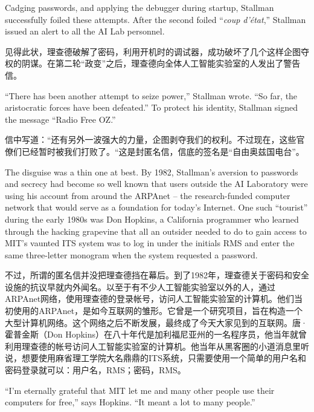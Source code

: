 \ifdefined\eng
Cadging passwords, and applying the debugger during startup, Stallman successfully foiled these attempts. After the second foiled ``\textit{coup d'état},'' Stallman issued an alert to all the AI Lab personnel.
\fi

\ifdefined\chs
见得此状，理查德破解了密码，利用开机时的调试器，成功破坏了几个这样企图夺权的阴谋。在第二轮``政变''之后，理查德向全体人工智能实验室的人发出了警告信。
\fi

\ifdefined\eng
``There has been another attempt to seize power,'' Stallman wrote. ``So far, the aristocratic forces have been defeated.'' To protect his identity, Stallman signed the message ``Radio Free OZ.''
\fi

\ifdefined\chs
信中写道：``还有另外一波强大的力量，企图剥夺我们的权利。不过现在，这些官僚们已经暂时被我们打败了。``这是封匿名信，信底的签名是``自由奥兹国电台''。
\fi

\ifdefined\eng
The disguise was a thin one at best. By 1982, Stallman's aversion to passwords and secrecy had become so well known that users outside the AI Laboratory were using his account from around the ARPAnet -- the research-funded computer network that would serve as a foundation for today's Internet. One such ``tourist'' during the early 1980s was Don Hopkins, a California programmer who learned through the hacking grapevine that all an outsider needed to do to gain access to MIT's vaunted ITS system was to log in under the initials RMS and enter the same three-letter monogram when the system requested a password.
\fi

\ifdefined\chs
不过，所谓的匿名信并没把理查德挡在幕后。到了1982年，理查德关于密码和安全设施的抗议早就内外闻名。以至于有不少人工智能实验室以外的人，通过ARPAnet网络，使用理查德的登录帐号，访问人工智能实验室的计算机。他们当初使用的ARPAnet，是如今互联网的雏形。它曾是一个研究项目，旨在构造一个大型计算机网络。这个网络之后不断发展，最终成了今天大家见到的互联网。唐·霍普金斯（Don Hopkins）在八十年代是加利福尼亚州的一名程序员，他当年就曾利用理查德的帐号访问人工智能实验室的计算机。他当年从黑客圈的小道消息里听说，想要使用麻省理工学院大名鼎鼎的ITS系统，只需要使用一个简单的用户名和密码登录就可以：用户名，RMS；密码，RMS。
\fi

\ifdefined\eng
``I'm eternally grateful that MIT let me and many other people use their computers for free,'' says Hopkins. ``It meant a lot to many people.''
\fi

